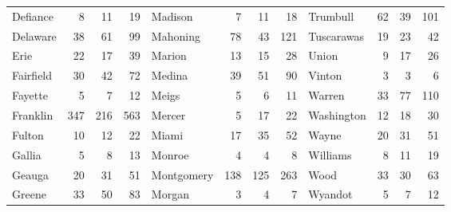 \begin{tabular}{lrrrlrrrlrrr}
  Defiance &   8 &  11 &  19 & Madison &   7 &  11 &  18 & Trumbull &  62 &  39 & 101 \\ 
  Delaware &  38 &  61 &  99 & Mahoning &  78 &  43 & 121 & Tuscarawas &  19 &  23 &  42 \\ 
  Erie &  22 &  17 &  39 & Marion &  13 &  15 &  28 & Union &   9 &  17 &  26 \\ 
  Fairfield &  30 &  42 &  72 & Medina &  39 &  51 &  90 & Vinton &   3 &   3 &   6 \\ 
  Fayette &   5 &   7 &  12 & Meigs &   5 &   6 &  11 & Warren &  33 &  77 & 110 \\ 
  Franklin & 347 & 216 & 563 & Mercer &   5 &  17 &  22 & Washington &  12 &  18 &  30 \\ 
  Fulton &  10 &  12 &  22 & Miami &  17 &  35 &  52 & Wayne &  20 &  31 &  51 \\ 
  Gallia &   5 &   8 &  13 & Monroe &   4 &   4 &   8 & Williams &   8 &  11 &  19 \\ 
  Geauga &  20 &  31 &  51 & Montgomery & 138 & 125 & 263 & Wood &  33 &  30 &  63 \\ 
  Greene &  33 &  50 &  83 & Morgan &   3 &   4 &   7 & Wyandot &   5 &   7 &  12 \\ 
   \hline
\end{tabular}
\endgroup

